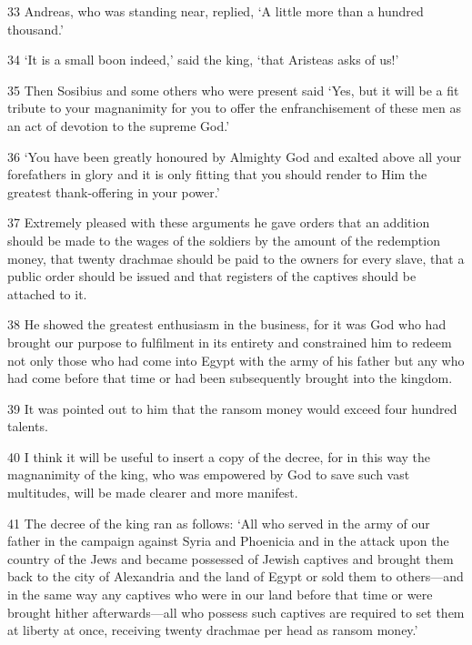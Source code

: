 \par 33 Andreas, who was standing near, replied, ‘A little more than a hundred thousand.’

\par 34 ‘It is a small boon indeed,’ said the king, ‘that Aristeas asks of us!’

\par 35 Then Sosibius and some others who were present said ‘Yes, but it will be a fit tribute to your magnanimity for you to offer the enfranchisement of these men as an act of devotion to the supreme God.’

\par 36 ‘You have been greatly honoured by Almighty God and exalted above all your forefathers in glory and it is only fitting that you should render to Him the greatest thank-offering in your power.’

\par 37 Extremely pleased with these arguments he gave orders that an addition should be made to the wages of the soldiers by the amount of the redemption money, that twenty drachmae should be paid to the owners for every slave, that a public order should be issued and that registers of the captives should be attached to it.

\par 38 He showed the greatest enthusiasm in the business, for it was God who had brought our purpose to fulfilment in its entirety and constrained him to redeem not only those who had come into Egypt with the army of his father but any who had come before that time or had been subsequently brought into the kingdom.

\par 39 It was pointed out to him that the ransom money would exceed four hundred talents.

\par 40 I think it will be useful to insert a copy of the decree, for in this way the magnanimity of the king, who was empowered by God to save such vast multitudes, will be made clearer and more manifest.

\par 41 The decree of the king ran as follows: ‘All who served in the army of our father in the campaign against Syria and Phoenicia and in the attack upon the country of the Jews and became possessed of Jewish captives and brought them back to the city of Alexandria and the land of Egypt or sold them to others—and in the same way any captives who were in our land before that time or were brought hither afterwards—all who possess such captives are required to set them at liberty at once, receiving twenty drachmae per head as ransom money.’

